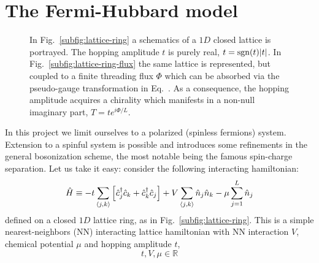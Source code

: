 \clearpage
\section{The Fermi-Hubbard model}

\begin{figure}
	\centering
	\hfil
	\caption{In Fig.~\ref{subfig:lattice-ring} a schematics of a $1D$ closed lattice is portrayed. The hopping amplitude $t$ is purely real, $t = \mathrm{sgn}(t) \abs{t}$. In Fig.~\ref{subfig:lattice-ring-flux} the same lattice is represented, but coupled to a finite threading flux $\Phi$ which can be absorbed via the pseudo-gauge transformation in Eq.~\todo. As a consequence, the hopping amplitude acquires a chirality which manifests in a non-null imaginary part, $T = t e^{i\Phi/L}$.}
	\label{fig:lattice-rings}
\end{figure}

In this project we limit ourselves to a polarized (spinless fermions) system. Extension to a spinful system is possible and introduces some refinements in the general bosonization scheme, the most notable being the famous spin-charge separation. Let us take it easy: consider the following interacting hamiltonian:
\begin{equation}\label{eq:spinless-hamiltonian-pbc}
	\hat H \equiv -t \sum_{\ev{j,k}} \left[
		\hat c_j^\dagger \hat c_k + \hat c_k^\dagger \hat c_j 
	\right] + V \sum_{\ev{j,k}} \hat n_j \hat n_k - \mu \sum_{j=1}^L \hat n_j
\end{equation}
defined on a closed $1D$ lattice ring, as in Fig.~\ref{subfig:lattice-ring}.
This is a simple nearest-neighbors (NN) interacting lattice hamiltonian with NN interaction $V$, chemical potential $\mu$ and hopping amplitude $t$,
\[
	t, V, \mu \in \mathbb{R}
\]


